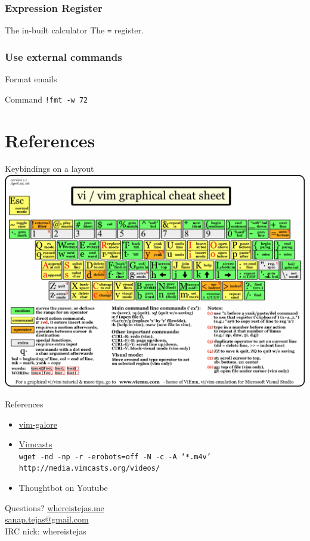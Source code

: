 \documentclass[11pt]{beamer}
\begin{document}
		\subsubsection{Expression Register}
		
		\begin{frame}{The in-built calculator}
			The \texttt{=} register.
		\end{frame}

		\subsubsection{Use external commands}

		\begin{frame}{Format emails}
			\begin{block}{Command}
				\texttt{!fmt -w 72}
			\end{block}
		\end{frame}

	\section{References}

		\begin{frame}{Keybindings on a layout}
			\includegraphics[width=\textwidth]{vimcheatsheet.png}
		\end{frame}

		\begin{frame}{References}
			\begin{itemize}
				\item \hyperlink{https://github.com/mhinz/vim-galore}{vim-galore}
				\item \hyperlink{http://vimcasts.org/}{Vimcasts} \\ \texttt{wget -nd -np -r -erobots=off -N -c -A `*.m4v' http://media.vimcasts.org/videos/}
				\item Thoughtbot on Youtube
			\end{itemize}	
		\end{frame}

		\begin{frame}{Questions?}
			\hyperlink{https://whereistejas.me}{whereistejas.me} \\
			\hyperlink{mailto:sanap.tejas@gmail.com}{sanap.tejas@gmail.com} \\
			IRC nick: whereistejas \\
		\end{frame}
\end{document}
